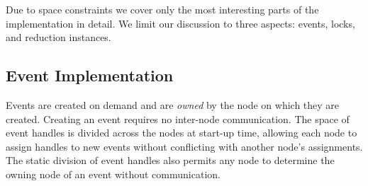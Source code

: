 Due to space constraints we cover only the most interesting parts of the implementation in detail.
We limit our discussion to three aspects:
events, locks, and reduction instances.

\subsection{Event Implementation}
\label{subsec:eventimpl}

Events are created on demand and are {\em owned} by the node on which they
are created.  Creating an event requires no inter-node communication.
The space of event
handles is divided across the nodes at start-up time, allowing each node to assign handles
to new events without conflicting with another node's assignments.  The static division
of event handles also permits any node to determine the owning node of an event
without communication.

